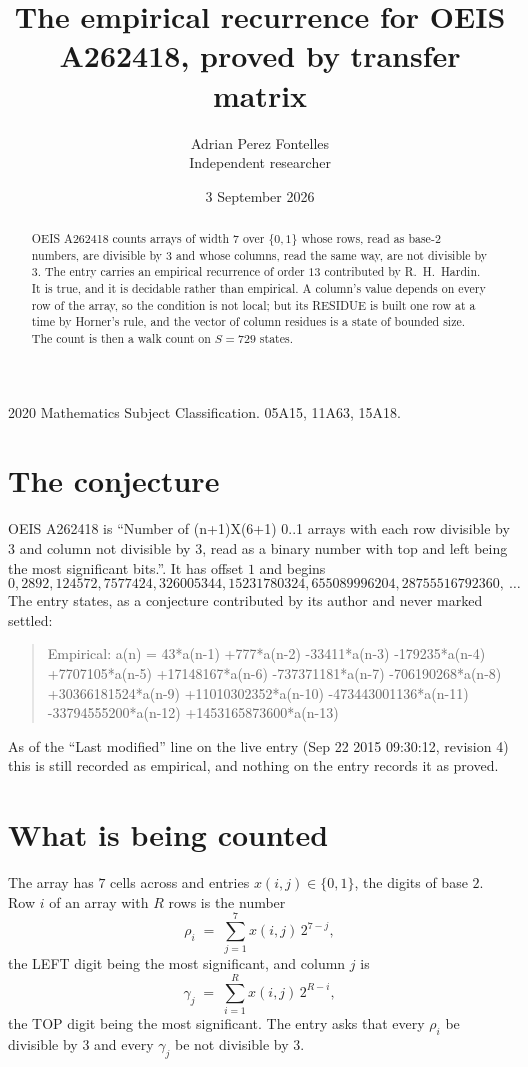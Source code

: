 \documentclass[11pt,a4paper]{article}
\title{The empirical recurrence for OEIS A262418, proved by transfer matrix}
\author{Adrian Perez Fontelles\\ \small Independent researcher}
\date{3 September 2026}
\theoremstyle{plain}
\theoremstyle{definition}
\begin{document}
\maketitle

\begin{abstract}
OEIS A262418 counts arrays of width $7$ over $\{0,1\}$ whose rows, read as base-$2$
numbers, are divisible by $3$ and whose columns, read the same way, are not divisible by
$3$. The entry carries an empirical recurrence of order $13$ contributed by
R.~H.~Hardin. It is true, and it is decidable rather than empirical. A column's value depends on
every row of the array, so the condition is not local; but its RESIDUE is built one row at a
time by Horner's rule, and the vector of column residues is a state of bounded size. The count
is then a walk count on $S=729$ states.
\end{abstract}

\noindent\small 2020 Mathematics Subject Classification. 05A15, 11A63, 15A18.\normalsize

\section{The conjecture}

OEIS A262418 is ``Number of (n+1)X(6+1) 0..1 arrays with each row divisible by 3 and column not divisible by 3, read as a binary number with top and left being the most significant bits.''. It has offset $1$ and begins
\[
0, 2892, 124572, 7577424, 326005344, 15231780324, 655089996204, 28755516792360,\ \dots
\]
The entry states, as a conjecture contributed by its author and never marked settled:
\begin{quote}
Empirical: a(n) = 43*a(n-1) +777*a(n-2) -33411*a(n-3) -179235*a(n-4) +7707105*a(n-5) +17148167*a(n-6) -737371181*a(n-7) -706190268*a(n-8) +30366181524*a(n-9) +11010302352*a(n-10) -473443001136*a(n-11) -33794555200*a(n-12) +1453165873600*a(n-13)
\end{quote}
As of the ``Last modified'' line on the live entry (Sep 22 2015 09:30:12, revision 4) this is still
recorded as empirical, and nothing on the entry records it as proved.

\section{What is being counted}

The array has $7$ cells across and entries $x(i,j)\in\{0,1\}$, the digits of
base $2$. Row $i$ of an array with $R$ rows is the number
\[
\rho_i\;=\;\sum_{j=1}^{7}x(i,j)\,2^{7-j} ,
\]
the LEFT digit being the most significant, and column $j$ is
\[
\gamma_j\;=\;\sum_{i=1}^{R}x(i,j)\,2^{R-i} ,
\]
the TOP digit being the most significant. The entry asks that every $\rho_i$ be divisible by
$3$ and every $\gamma_j$ be not divisible by $3$.
\end{document}
